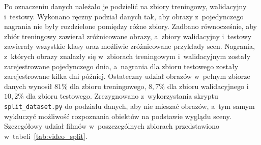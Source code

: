 Po oznaczeniu danych należało je podzielić na zbiory treningowy, walidacyjny i~testowy. Wykonano ręczny podział danych tak, aby obrazy z~pojedynczego nagrania nie były rozdzielone pomiędzy różne zbiory. Zadbano równocześnie, aby zbiór treningowy zawierał zróżnicowane obrazy, a~zbiory walidacyjny i~testowy zawierały wszystkie klasy oraz możliwie zróżnicowane przykłady scen. Nagrania, z~których obrazy znalazły się w~zbiorach treningowym i~walidacyjnym zostały zarejestrowane pojedynczego dnia, a~nagrania dla zbioru testowego zostały zarejestrowane kilka dni później. Ostateczny udział obrazów w~pełnym zbiorze danych wynosił $81\%$ dla zbioru treningowego, $8,7\%$ dla zbioru walidacyjnego i~$10,2\%$ dla zbioru testowego. Zrezygnowano z~wykorzystania skryptu \texttt{split\_dataset.py} do podziału danych, aby nie mieszać obrazów, a~tym samym wykluczyć możliwość rozpoznania obiektów na podstawie wyglądu sceny. Szczegółowy udział filmów w~poszczególnych zbiorach przedstawiono w~tabeli~\ref{tab:video_split}.

